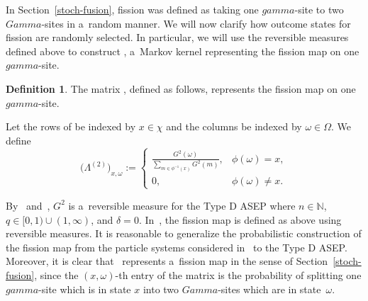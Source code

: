 \documentclass[10pt,a4paper]{amsart}
\numberwithin{equation}{section}
\theoremstyle{definition}
\newtheorem{Definition}[Theorem]{Definition}
\def\Gamma{Gamma}
\def\gamma{gamma}
\begin{document}
In Section~\ref{stoch-fusion}, fission was defined as taking one $\gamma$-site to two $\Gamma$-sites in a~random manner. We will now clarify how outcome states for fission are randomly selected. In particular, we will use the reversible measures defined above to construct , a~Markov kernel representing the fission map on one $\gamma$-site.

\begin{Definition}
 \label{LambdaTwo}
 The matrix , defined as follows, represents the fission map on one $\gamma$-site.

 Let the rows of  be indexed by $x \in \chi$ and the columns be indexed by $\omega \in \Omega$. We define
\[
 \bigl(\Lambda^{(2)}\bigr)_{x, \omega} :=
 \begin{cases}
 \frac{G^2(\omega)}{\sum\limits_{m \in \phi^{-1}(x)} G^2(m)}, & \phi(\omega) = x ,\\
 0, & \phi(\omega) \neq x.
 \end{cases}
\]
\end{Definition}
By~\cite[Proposition 1.3]{kuan2020interactingparticlesystemstype} and~\cite[Section 3.1]{Blyschak_2023}, $G^2$ is a~reversible measure for the Type D ASEP where $n \in \mathbb{N}$, $q \in [0,1) \cup(1,\infty)$, and $\delta = 0$. In~\cite{kuan2019stochastic}, the fission map is defined as above using reversible measures. It is reasonable to generalize the probabilistic construction of the fission map from the particle systems considered in~\cite{kuan2019stochastic} to the Type D ASEP. Moreover, it is clear that~ represents a~fission map in the sense of Section~\ref{stoch-fusion}, since the $(x,\omega)$-th entry of the matrix is the probability of splitting one $\gamma$-site which is in state $x$ into two $\Gamma$-sites which are in state~$\omega$.
\end{document}
